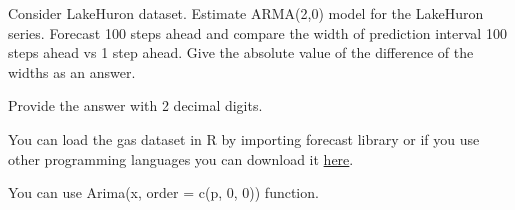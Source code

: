 
\begin{question}
Consider LakeHuron dataset.
Estimate ARMA(2,0) model for the LakeHuron series. Forecast 100 steps ahead and compare the width of prediction interval 100 steps ahead vs 1 step ahead. Give the absolute value of the difference of the widths as an answer.

Provide the answer with 2 decimal digits.

You can load the gas dataset in R by importing forecast library or if you use other programming languages you can download it \href{https://github.com/vincentarelbundock/Rdatasets/blob/master/csv/forecast/gas.csv}{here}.
\end{question}

\begin{solution}
You can use Arima(x, order = c(p, 0, 0)) function.
\end{solution}

